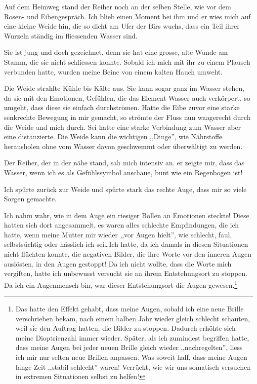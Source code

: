 \documentclass[11pt,titlepage,a5paper]{book}
\begin{document}
Auf dem Heimweg stand der Reiher noch an der selben Stelle, wie vor dem Rosen- und Eibengespräch. Ich blieb einen Moment bei ihm und er wies mich auf eine kleine Weide hin, die so dicht am Ufer der Birs wuchs, dass ein Teil ihrer Wurzeln ständig im fliessenden Wasser sind.

Sie ist jung und doch gezeichnet, denn sie hat eine grosse, alte Wunde am Stamm, die sie nicht schliessen konnte. Sobald ich mich mit ihr zu einem Plausch verbunden hatte, wurden meine Beine von einem kalten Hauch umweht.

Die Weide strahlte Kühle bis Kälte aus. Sie kann sogar ganz im Wasser stehen, da sie mit den Emotionen, Gefühlen, die das Element Wasser auch verkörpert, so umgeht, dass diese sie einfach durchströmen. Hatte die Eibe zuvor eine starke senkrechte Bewegung in mir gemacht, so strömte der Fluss nun waagerecht durch die Weide und mich durch. Sei hatte eine starke Verbindung zum Wasser aber eine distanzierte. Die Weide kann die wichtigen ,,Dinge'', wie Nährstoffe herausholen ohne vom Wasser davon geschwemmt oder überwältigt zu werden.

Der Reiher, der in der nähe stand, sah mich intensiv an. er zeigte mir, dass das Wasser, wenn ich es als Gefühlssymbol anschaue, bunt wie ein Regenbogen ist!

Ich spürte zurück zur Weide und spürte stark das rechte Auge, dass mir so viele Sorgen gemachte.

Ich nahm wahr, wie in dem Auge ein riesiger Bollen an Emotionen steckte! Diese hatten sich dort angesammelt. es waren alles schlechte Empfindungen, die ich hatte, wenn meine Mutter mir wieder ,,vor Augen hielt'', wie schlecht, faul, selbstsüchtig oder hässlich ich sei\dots Ich hatte, da ich damals in diesen Situationen nicht flüchten konnte, die negativen Bilder, die ihre Worte vor den inneren Augen auslösten, in den Augen gestoppt! Da ich nicht wollte, dass die Worte mich vergiften, hatte ich unbewusst versucht sie an ihrem Entstehungsort zu stoppen. Da ich ein Augenmensch bin, war dieser Entstehungsort die Augen gewesen.\footnote{Das hatte den Effekt gehabt, dass meine Augen, sobald ich eine neue Brille verschrieben bekam, nach einem halben Jahr wieder gleich schlecht schauten, weil sie den Auftrag hatten, die Bilder zu stoppen. Dadurch erhöhte sich meine Dioptrienzahl immer wieder. Später, als ich zumindest begriffen hatte, dass meine Augen bei jeder neuen Brille gleich wieder ,,nachregelten'', liess ich mir nur selten neue Brillen anpassen. Was soweit half, dass meine Augen lange Zeit ,,stabil schlecht'' waren! Verrückt, wie wir uns somatisch versuchen in extremen Situationen selbst zu helfen!}
\end{document}
